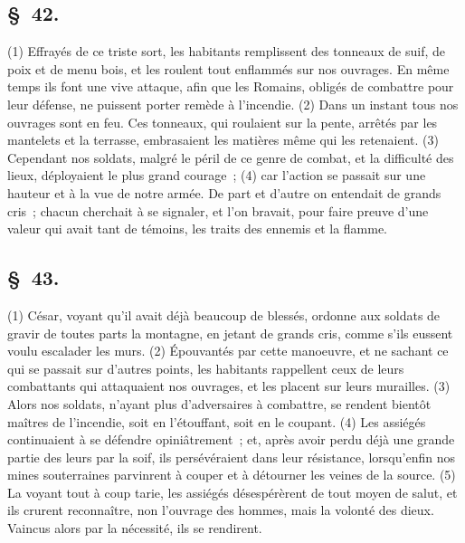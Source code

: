 \documentclass[french,twoside]{book} %
\begin{document}
\subsection[{§ 42.}]{ \textsc{§ 42.} }
\noindent (1) Effrayés de ce triste sort, les habitants remplissent des tonneaux de suif, de poix et de menu bois, et les roulent tout enflammés sur nos ouvrages. En même temps ils font une vive attaque, afin que les Romains, obligés de combattre pour leur défense, ne puissent porter remède à l’incendie. (2) Dans un instant tous nos ouvrages sont en feu. Ces tonneaux, qui roulaient sur la pente, arrêtés par les mantelets et la terrasse, embrasaient les matières même qui les retenaient. (3) Cependant nos soldats, malgré le péril de ce genre de combat, et la difficulté des lieux, déployaient le plus grand courage ; (4) car l’action se passait sur une hauteur et à la vue de notre armée. De part et d’autre on entendait de grands cris ; chacun cherchait à se signaler, et l’on bravait, pour faire preuve d’une valeur qui avait tant de témoins, les traits des ennemis et la flamme.
\subsection[{§ 43.}]{ \textsc{§ 43.} }
\noindent (1) César, voyant qu’il avait déjà beaucoup de blessés, ordonne aux soldats de gravir de toutes parts la montagne, en jetant de grands cris, comme s’ils eussent voulu escalader les murs. (2) Épouvantés par cette manoeuvre, et ne sachant ce qui se passait sur d’autres points, les habitants rappellent ceux de leurs combattants qui attaquaient nos ouvrages, et les placent sur leurs murailles. (3) Alors nos soldats, n’ayant plus d’adversaires à combattre, se rendent bientôt maîtres de l’incendie, soit en l’étouffant, soit en le coupant. (4) Les assiégés continuaient à se défendre opiniâtrement ; et, après avoir perdu déjà une grande partie des leurs par la soif, ils persévéraient dans leur résistance, lorsqu’enfin nos mines souterraines parvinrent à couper et à détourner les veines de la source. (5) La voyant tout à coup tarie, les assiégés désespérèrent de tout moyen de salut, et ils crurent reconnaître, non l’ouvrage des hommes, mais la volonté des dieux. Vaincus alors par la nécessité, ils se rendirent.
\end{document}
